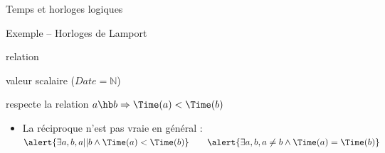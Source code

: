 \begin{frame}{Temps et horloges logiques}
  \vspace{-1mm}
  \begin{alertblock}{Exemple -- Horloges de Lamport}
    \vspace{-2mm}
    \begin{description}[Horloge :]
    \item[Temps :] relation 
    \item[Date :] valeur scalaire (\alert{$\mathit{Date}=\mathbb N$})
    \item[Horloge :] \vspace{-1mm} respecte la relation  \hfill \alert{$a \hb b  \Rightarrow \Time(a) < \Time(b)$}
      \begin{itemize}
      \item La réciproque n'est pas vraie en général :\\
        $\alert{\exists a, b, a || b \land \Time(a) < \Time(b)} \quad \quad \alert{\exists a, b, a \neq b \land \Time(a) = \Time(b)}$
      \end{itemize}
    \end{description}

  \end{alertblock}
  
\end{frame}

\endgroup
\endinput


